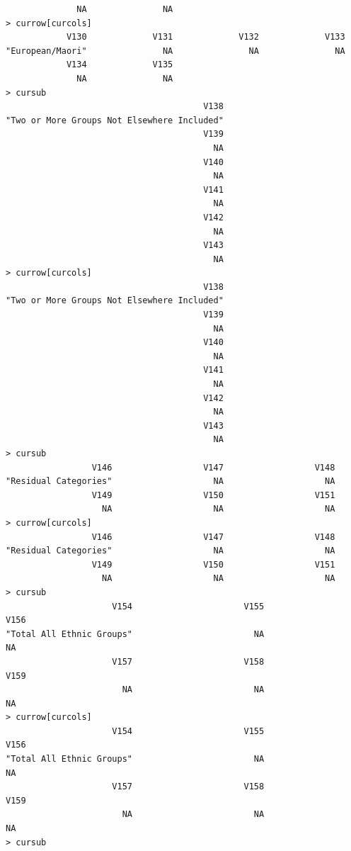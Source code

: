 \documentclass[a4paper]{article}
\begin{document}
\begin{verbatim}
              NA               NA 
> currow[curcols] 
            V130             V131             V132             V133 
"European/Maori"               NA               NA               NA 
            V134             V135 
              NA               NA 
> cursub 
                                       V138 
"Two or More Groups Not Elsewhere Included" 
                                       V139 
                                         NA 
                                       V140 
                                         NA 
                                       V141 
                                         NA 
                                       V142 
                                         NA 
                                       V143 
                                         NA 
> currow[curcols] 
                                       V138 
"Two or More Groups Not Elsewhere Included" 
                                       V139 
                                         NA 
                                       V140 
                                         NA 
                                       V141 
                                         NA 
                                       V142 
                                         NA 
                                       V143 
                                         NA 
> cursub 
                 V146                  V147                  V148 
"Residual Categories"                    NA                    NA 
                 V149                  V150                  V151 
                   NA                    NA                    NA 
> currow[curcols] 
                 V146                  V147                  V148 
"Residual Categories"                    NA                    NA 
                 V149                  V150                  V151 
                   NA                    NA                    NA 
> cursub 
                     V154                      V155                      V156 
"Total All Ethnic Groups"                        NA                        NA 
                     V157                      V158                      V159 
                       NA                        NA                        NA 
> currow[curcols] 
                     V154                      V155                      V156 
"Total All Ethnic Groups"                        NA                        NA 
                     V157                      V158                      V159 
                       NA                        NA                        NA 
> cursub 

\end{verbatim}
\end{document}
